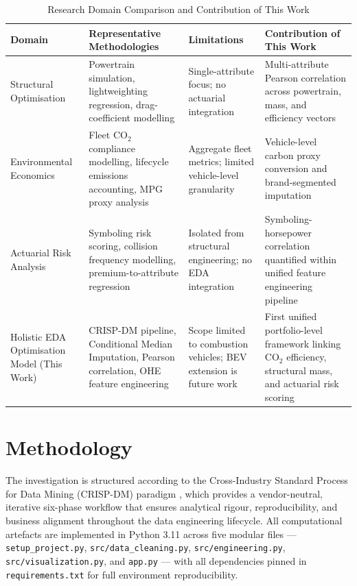 \documentclass[conference]{IEEEtran}
\begin{document}
\begin{table}[!t]
\caption{Research Domain Comparison and Contribution of This Work}
\label{tab:litreview}
\renewcommand{\arraystretch}{1.3}
\begin{tabular}{|p{1.6cm}|p{2.1cm}|p{1.8cm}|p{1.8cm}|}
\hline
\textbf{Domain} & \textbf{Representative Methodologies} &
\textbf{Limitations} & \textbf{Contribution of This Work} \\
\hline
Structural Optimisation &
  Powertrain simulation, lightweighting regression, drag-coefficient modelling &
  Single-attribute focus; no actuarial integration &
  Multi-attribute Pearson correlation across powertrain, mass, and efficiency vectors \\
\hline
Environmental Economics &
  Fleet CO$_2$ compliance modelling, lifecycle emissions accounting, MPG proxy analysis &
  Aggregate fleet metrics; limited vehicle-level granularity &
  Vehicle-level carbon proxy conversion and brand-segmented imputation \\
\hline
Actuarial Risk Analysis &
  Symboling risk scoring, collision frequency modelling, premium-to-attribute regression &
  Isolated from structural engineering; no EDA integration &
  Symboling-horsepower correlation quantified within unified feature engineering pipeline \\
\hline
Holistic EDA Optimisation Model (This Work) &
  CRISP-DM pipeline, Conditional Median Imputation, Pearson correlation, OHE feature engineering &
  Scope limited to combustion vehicles; BEV extension is future work &
  First unified portfolio-level framework linking CO$_2$ efficiency, structural mass, and actuarial risk scoring \\
\hline
\end{tabular}
\end{table}

\section{Methodology}

The investigation is structured according to the Cross-Industry Standard
Process for Data Mining (CRISP-DM) paradigm \cite{wirth2000crisp}, which
provides a vendor-neutral, iterative six-phase workflow that ensures
analytical rigour, reproducibility, and business alignment throughout the
data engineering lifecycle. All computational artefacts are implemented
in Python 3.11 across five modular files — \texttt{setup\_project.py},
\texttt{src/data\_cleaning.py}, \texttt{src/engineering.py},
\texttt{src/visualization.py}, and \texttt{app.py} — with all
dependencies pinned in \texttt{requirements.txt} for full environment
reproducibility.
\end{document}
